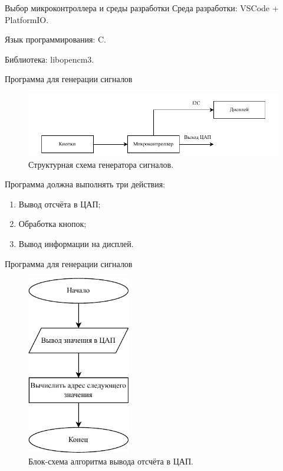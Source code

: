\documentclass[10pt]{beamer}
\begin{document}
\begin{frame}{Выбор микроконтроллера и среды разработки}
  Среда разработки: VSCode + PlatformIO.
  
  Язык программирования: C.
  
  Библиотека: libopencm3.
\end{frame}


\begin{frame}{Программа для генерации сигналов}
  \begin{figure}
  \includegraphics[width=1\textwidth]{struct_gen}
  \caption{Структурная схема генератора сигналов.}
  \end{figure}
  Программа должна выполнять три действия:
  	\begin{enumerate}
		\item Вывод отсчёта в ЦАП;
		\item Обработка кнопок;
		\item Вывод информации на дисплей.
	\end{enumerate}
\end{frame}

\begin{frame}{Программа для генерации сигналов}
  \begin{figure}
  \includegraphics[width=0.4\textwidth]{dac}
  \caption{Блок-схема алгоритма вывода отсчёта в ЦАП.}
  \end{figure}
\end{frame}
\end{document}
